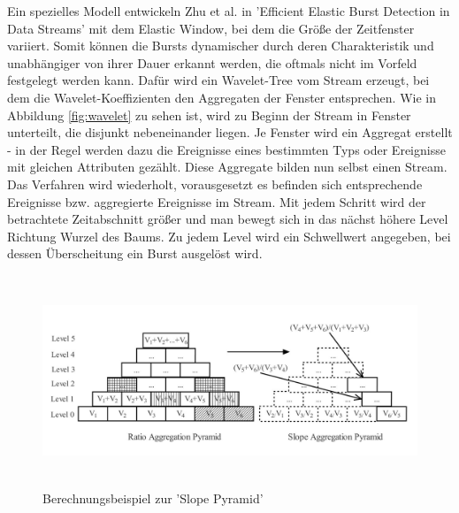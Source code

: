Ein spezielles Modell entwickeln Zhu et al. in 'Efficient Elastic Burst Detection in Data Streams' \cite{Zhu:2003:EEB:956750.956789} mit dem Elastic Window, bei dem   die Größe der Zeitfenster variiert. Somit können die Bursts dynamischer durch deren Charakteristik und unabhängiger von ihrer Dauer erkannt werden, die oftmals nicht im Vorfeld festgelegt werden kann. Dafür wird ein Wavelet-Tree vom Stream erzeugt, bei dem die Wavelet-Koeffizienten den Aggregaten der Fenster entsprechen. Wie in Abbildung \ref{fig:wavelet} zu sehen ist, wird zu Beginn der Stream in Fenster unterteilt, die disjunkt nebeneinander liegen. Je Fenster wird ein Aggregat erstellt - in der Regel werden dazu die Ereignisse eines bestimmten Typs oder Ereignisse mit gleichen Attributen gezählt. Diese Aggregate bilden nun selbst einen Stream. Das Verfahren wird wiederholt, vorausgesetzt es befinden sich entsprechende Ereignisse bzw. aggregierte Ereignisse im Stream. Mit jedem Schritt wird der betrachtete Zeitabschnitt größer und man bewegt sich in das nächst höhere Level Richtung Wurzel des Baums. Zu jedem Level wird ein Schwellwert angegeben, bei dessen Überscheitung ein Burst ausgelöst wird.\\

\begin{figure}[h]
\centerline{\includegraphics[height=6.3cm]{images/slopepyramid.jpg}}
\caption{Berechnungsbeispiel zur 'Slope Pyramid' \cite{yuan2007online}}
\label{fig:slopepyramid}
\end{figure}




